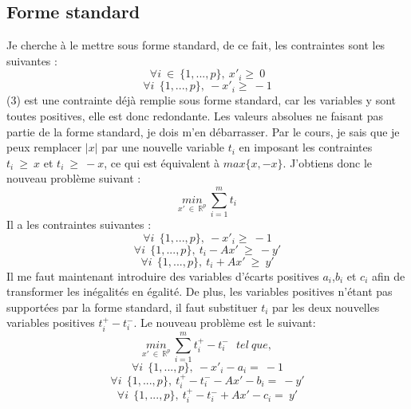 \documentclass[]{article}
\begin{document}
\subsection{Forme standard}
Je cherche à le mettre sous forme standard, de ce fait, les contraintes sont les suivantes : 
\begin{equation}
\forall i \ \in \ \lbrace 1,...,p \rbrace , \ x'_{i} \geq \ 0
\end{equation}
\begin{equation}
\forall i \  \ \lbrace 1,...,p \rbrace , \ -x'_{i} \geq \ -1
\end{equation}
(3) est une contrainte déjà remplie sous forme standard, car les variables y sont toutes positives, elle est donc redondante. Les valeurs absolues ne faisant pas partie de la forme standard, je dois m'en débarrasser. Par le cours, je sais que je peux remplacer $|x|$ par une nouvelle variable $t_{i}$  en imposant les contraintes $t_{i} \ \geq \ x$ et  $t_{i} \ \geq \ -x$, ce qui est équivalent à $max \lbrace x,-x \rbrace$. J'obtiens donc le nouveau problème suivant : 
\begin{equation}
\underset{x' \ \in \ \mathbb{R}^{p}}{min} \ \sum_{i = 1}^{m} t_{i}  
\end{equation}
Il a les contraintes suivantes : 
\begin{equation}
\forall i \  \ \lbrace 1,...,p \rbrace , \ -x'_{i} \geq \ -1
\end{equation}
\begin{equation}
\forall i \  \ \lbrace 1,...,p \rbrace , \ t_{i} - Ax' \ \geq \ -y'
\end{equation}
\begin{equation}
\forall i \  \ \lbrace 1,...,p \rbrace , \ t_{i} + Ax' \ \geq \ y'
\end{equation}
Il me faut maintenant introduire des variables d'écarts positives $a_{i}$,$b_{i}$ et $c_{i}$  afin de transformer les inégalités en égalité. De plus, les variables positives n'étant pas supportées par la forme standard, il faut substituer $t_{i}$ par les deux nouvelles variables positives $t_{i}^{+} - t_{i}^{-}$. Le nouveau problème est le suivant: 
\begin{equation}
\underset{x' \ \in \ \mathbb{R}^{p}}{min} \ \sum_{i = 1}^{m} t_{i}^{+} - t_{i}^{-} \ \ \ tel \ que,  
\end{equation}
\begin{equation}
\forall i \  \ \lbrace 1,...,p \rbrace , \ -x'_{i} - a_{i} = \ -1
\end{equation}
\begin{equation}
\forall i \  \ \lbrace 1,...,p \rbrace , \ t_{i}^{+} - t_{i}^{-} - Ax' - b_{i} = \ -y'
\end{equation}
\begin{equation}
\forall i \  \ \lbrace 1,...,p \rbrace , \ t_{i}^{+} - t_{i}^{-} + Ax'  - c_{i}  = \ y'
\end{equation}
\end{document}
